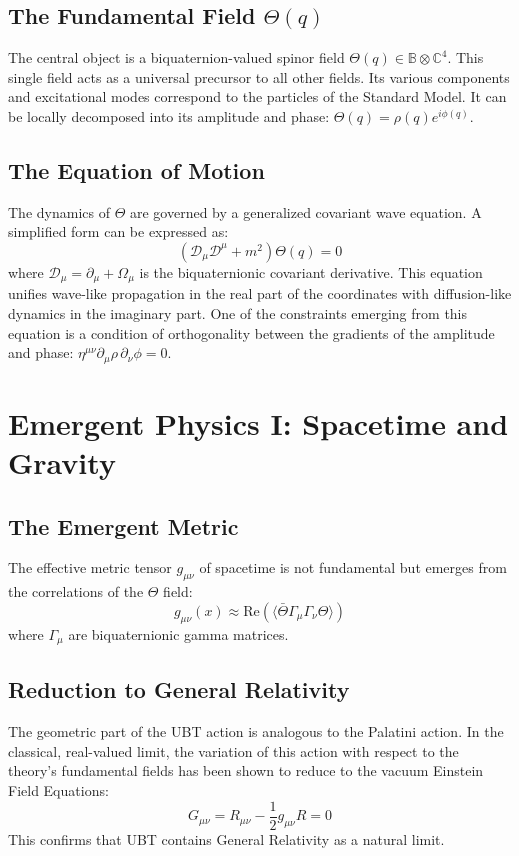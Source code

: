 \documentclass[12pt, a4paper]{article}
\begin{document}
\subsection{The Fundamental Field \( \Theta(q) \)}
The central object is a biquaternion-valued spinor field \( \Theta(q) \in \mathbb{B} \otimes \mathbb{C}^4 \). This single field acts as a universal precursor to all other fields. Its various components and excitational modes correspond to the particles of the Standard Model. It can be locally decomposed into its amplitude and phase: \( \Theta(q) = \rho(q) e^{i\phi(q)} \).

\subsection{The Equation of Motion}
The dynamics of \( \Theta \) are governed by a generalized covariant wave equation. A simplified form can be expressed as:
\begin{equation}
    \left( \mathcal{D}_\mu \mathcal{D}^\mu + m^2 \right) \Theta(q) = 0
\end{equation}
where \( \mathcal{D}_\mu = \partial_\mu + \Omega_\mu \) is the biquaternionic covariant derivative. This equation unifies wave-like propagation in the real part of the coordinates with diffusion-like dynamics in the imaginary part. One of the constraints emerging from this equation is a condition of orthogonality between the gradients of the amplitude and phase: \( \eta^{\mu\nu} \partial_\mu \rho \, \partial_\nu \phi = 0 \).


\section{Emergent Physics I: Spacetime and Gravity}

\subsection{The Emergent Metric}
The effective metric tensor \( g_{\mu\nu} \) of spacetime is not fundamental but emerges from the correlations of the \( \Theta \) field:
\begin{equation}
g_{\mu\nu}(x) \approx \text{Re}(\langle \bar{\Theta} \Gamma_\mu \Gamma_\nu \Theta \rangle)
\end{equation}
where \( \Gamma_\mu \) are biquaternionic gamma matrices.

\subsection{Reduction to General Relativity}
The geometric part of the UBT action is analogous to the Palatini action. In the classical, real-valued limit, the variation of this action with respect to the theory's fundamental fields has been shown to reduce to the vacuum Einstein Field Equations:
\begin{equation}
G_{\mu\nu} = R_{\mu\nu} - \frac{1}{2} g_{\mu\nu} R = 0
\end{equation}
This confirms that UBT contains General Relativity as a natural limit.
\end{document}
